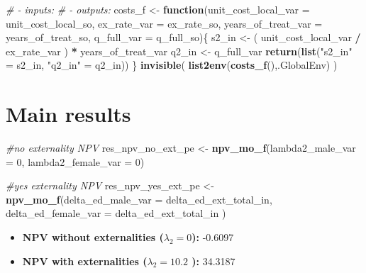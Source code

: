 \documentclass[]{article}
\newenvironment{Shaded}{\begin{snugshade}}{\end{snugshade}}
\newcommand{\CommentTok}[1]{\textcolor[rgb]{0.56,0.35,0.01}{\textit{#1}}}
\newcommand{\ControlFlowTok}[1]{\textcolor[rgb]{0.13,0.29,0.53}{\textbf{#1}}}
\newcommand{\DataTypeTok}[1]{\textcolor[rgb]{0.13,0.29,0.53}{#1}}
\newcommand{\DecValTok}[1]{\textcolor[rgb]{0.00,0.00,0.81}{#1}}
\newcommand{\KeywordTok}[1]{\textcolor[rgb]{0.13,0.29,0.53}{\textbf{#1}}}
\newcommand{\NormalTok}[1]{#1}
\newcommand{\OperatorTok}[1]{\textcolor[rgb]{0.81,0.36,0.00}{\textbf{#1}}}
\newcommand{\StringTok}[1]{\textcolor[rgb]{0.31,0.60,0.02}{#1}}
\begin{document}
\begin{Shaded}
\begin{Highlighting}[]
\CommentTok{# - inputs: }
\CommentTok{# - outputs: }
\NormalTok{costs_f <-}\StringTok{ }\ControlFlowTok{function}\NormalTok{(}\DataTypeTok{unit_cost_local_var =}\NormalTok{ unit_cost_local_so, }\DataTypeTok{ex_rate_var =}\NormalTok{ ex_rate_so,}
                    \DataTypeTok{years_of_treat_var =}\NormalTok{ years_of_treat_so, }\DataTypeTok{q_full_var =}\NormalTok{ q_full_so)\{}
\NormalTok{    s2_in <-}\StringTok{ }\NormalTok{( unit_cost_local_var }\OperatorTok{/}\StringTok{ }\NormalTok{ex_rate_var ) }\OperatorTok{*}\StringTok{ }\NormalTok{years_of_treat_var}
\NormalTok{    q2_in <-}\StringTok{ }\NormalTok{q_full_var}
    \KeywordTok{return}\NormalTok{(}\KeywordTok{list}\NormalTok{(}\StringTok{"s2_in"}\NormalTok{ =}\StringTok{ }\NormalTok{s2_in, }\StringTok{"q2_in"}\NormalTok{ =}\StringTok{ }\NormalTok{q2_in)) }
\NormalTok{\} }
\KeywordTok{invisible}\NormalTok{( }\KeywordTok{list2env}\NormalTok{(}\KeywordTok{costs_f}\NormalTok{(),.GlobalEnv) )}
\end{Highlighting}
\end{Shaded}

\hypertarget{main-results}{%
\section{Main results}\label{main-results}}

\begin{Shaded}
\begin{Highlighting}[]
\CommentTok{#no externality NPV}
\NormalTok{res_npv_no_ext_pe <-}\StringTok{ }\KeywordTok{npv_mo_f}\NormalTok{(}\DataTypeTok{lambda2_male_var =} \DecValTok{0}\NormalTok{, }\DataTypeTok{lambda2_female_var =} \DecValTok{0}\NormalTok{)}

\CommentTok{#yes externality NPV}
\NormalTok{res_npv_yes_ext_pe <-}\StringTok{ }\KeywordTok{npv_mo_f}\NormalTok{(}\DataTypeTok{delta_ed_male_var =}\NormalTok{ delta_ed_ext_total_in,}
                       \DataTypeTok{delta_ed_female_var =}\NormalTok{ delta_ed_ext_total_in )}
\end{Highlighting}
\end{Shaded}

\begin{itemize}
\item
  \textbf{NPV without externalities (\(\lambda_2 = 0\)):} -0.6097
\item
  \textbf{NPV with externalities (\(\lambda_2 = 10.2\) ):} 34.3187
\end{itemize}
\end{document}
